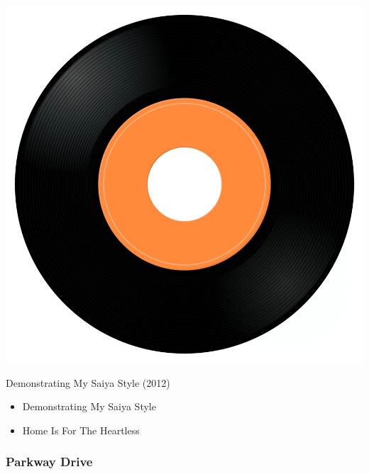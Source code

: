 \begin{minipage}[t]{0.25\textwidth}\vspace{0pt}
\captionsetup{type=figure}
\includegraphics[width=\textwidth]{Images/cover.png}
\caption*{Demonstrating My Saiya Style (2012)}
\end{minipage}
\begin{minipage}[t]{0.25\textwidth}\vspace{0pt}
\begin{itemize}[nosep,leftmargin=1em,labelwidth=*,align=left]
	\setlength{\itemsep}{0pt}
	\item Demonstrating My Saiya Style
	\item Home Is For The Heartless
\end{itemize}
\end{minipage}

\subsubsection{Parkway Drive}

